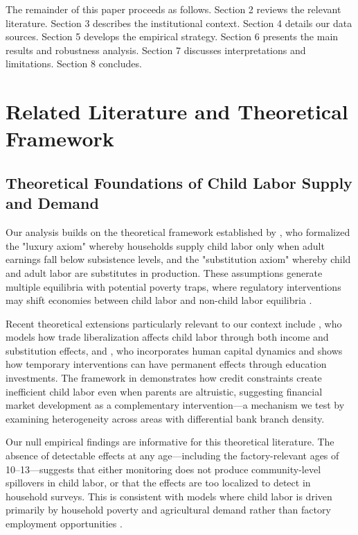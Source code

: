 \documentclass[12pt]{article}
\begin{document}
The remainder of this paper proceeds as follows. Section 2 reviews the relevant literature. Section 3 describes the institutional context. Section 4 details our data sources. Section 5 develops the empirical strategy. Section 6 presents the main results and robustness analysis. Section 7 discusses interpretations and limitations. Section 8 concludes.

\section{Related Literature and Theoretical Framework}

\subsection{Theoretical Foundations of Child Labor Supply and Demand}

Our analysis builds on the theoretical framework established by \cite{basu1998economics}, who formalized the "luxury axiom" whereby households supply child labor only when adult earnings fall below subsistence levels, and the "substitution axiom" whereby child and adult labor are substitutes in production. These assumptions generate multiple equilibria with potential poverty traps, where regulatory interventions may shift economies between child labor and non-child labor equilibria \cite{basu2000intergenerational, doepke2005dynamics}.

Recent theoretical extensions particularly relevant to our context include \citet{edmonds2007selection}, who models how trade liberalization affects child labor through both income and substitution effects, and \citet{dumas2020child}, who incorporates human capital dynamics and shows how temporary interventions can have permanent effects through education investments. The framework in \citet{baland2000child} demonstrates how credit constraints create inefficient child labor even when parents are altruistic, suggesting financial market development as a complementary intervention—a mechanism we test by examining heterogeneity across areas with differential bank branch density.

Our null empirical findings are informative for this theoretical literature. The absence of detectable effects at any age---including the factory-relevant ages of 10--13---suggests that either monitoring does not produce community-level spillovers in child labor, or that the effects are too localized to detect in household surveys. This is consistent with models where child labor is driven primarily by household poverty and agricultural demand rather than factory employment opportunities \citep{Edmonds2007}.
\end{document}
